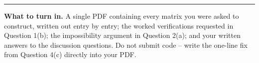 \documentclass[11pt]{article}
\begin{document}
\vspace{1em}
\hrule
\vspace{0.5em}
\noindent
\small
\textbf{What to turn in.} A single PDF containing every matrix you were asked to construct, written out
entry by entry; the worked verifications requested in Question 1(b); the impossibility argument in
Question 2(a); and your written answers to the discussion questions. Do not submit code -- write the one-line
fix from Question 4(c) directly into your PDF.
\end{document}

